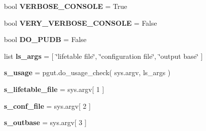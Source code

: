 \begin{DoxyCompactItemize}
\item 
bool {\bfseries V\+E\+R\+B\+O\+S\+E\+\_\+\+C\+O\+N\+S\+O\+LE} = True\hypertarget{namespacenegui_1_1pgopsimupop_a012d3bad48488d7f2312437c1b784200}{}\label{namespacenegui_1_1pgopsimupop_a012d3bad48488d7f2312437c1b784200}

\item 
bool {\bfseries V\+E\+R\+Y\+\_\+\+V\+E\+R\+B\+O\+S\+E\+\_\+\+C\+O\+N\+S\+O\+LE} = False\hypertarget{namespacenegui_1_1pgopsimupop_ab5a9b5da57986211741b4a634e2f464e}{}\label{namespacenegui_1_1pgopsimupop_ab5a9b5da57986211741b4a634e2f464e}

\item 
bool {\bfseries D\+O\+\_\+\+P\+U\+DB} = False\hypertarget{namespacenegui_1_1pgopsimupop_aad4ebdbadcdf46959a4fe2f34b95e88c}{}\label{namespacenegui_1_1pgopsimupop_aad4ebdbadcdf46959a4fe2f34b95e88c}

\item 
list {\bfseries ls\+\_\+args} = \mbox{[} \char`\"{}lifetable file\char`\"{}, \char`\"{}configuration file\char`\"{}, \char`\"{}output base\char`\"{} \mbox{]}\hypertarget{namespacenegui_1_1pgopsimupop_a46ea457904890dab8ede52052983692c}{}\label{namespacenegui_1_1pgopsimupop_a46ea457904890dab8ede52052983692c}

\item 
{\bfseries s\+\_\+usage} = pgut.\+do\+\_\+usage\+\_\+check( sys.\+argv, ls\+\_\+args )\hypertarget{namespacenegui_1_1pgopsimupop_a11e7f1bec9125f9d94dde7a90388d5bd}{}\label{namespacenegui_1_1pgopsimupop_a11e7f1bec9125f9d94dde7a90388d5bd}

\item 
{\bfseries s\+\_\+lifetable\+\_\+file} = sys.\+argv\mbox{[} 1 \mbox{]}\hypertarget{namespacenegui_1_1pgopsimupop_a35a54163d82dbd1ddbb96e7d1cf1ad92}{}\label{namespacenegui_1_1pgopsimupop_a35a54163d82dbd1ddbb96e7d1cf1ad92}

\item 
{\bfseries s\+\_\+conf\+\_\+file} = sys.\+argv\mbox{[} 2 \mbox{]}\hypertarget{namespacenegui_1_1pgopsimupop_a67afb09bc187a54d3173444bab6288e9}{}\label{namespacenegui_1_1pgopsimupop_a67afb09bc187a54d3173444bab6288e9}

\item 
{\bfseries s\+\_\+outbase} = sys.\+argv\mbox{[} 3 \mbox{]}\hypertarget{namespacenegui_1_1pgopsimupop_af359ecec2ed0e032f754420b48f0eea5}{}\label{namespacenegui_1_1pgopsimupop_af359ecec2ed0e032f754420b48f0eea5}


\end{DoxyCompactItemize}
